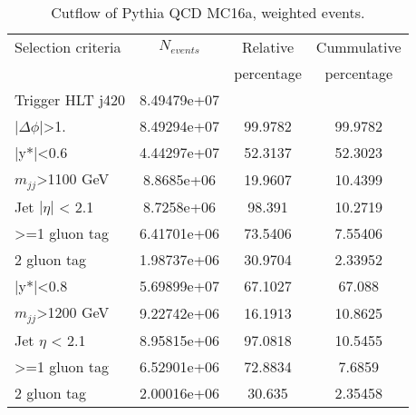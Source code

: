 \begin{table}[ht]
\begin{center}
\begin{tabular}{|l|c|c|c|}
\hline
Selection criteria & $N_{events}$ & Relative & Cummulative  \\
 & & percentage & percentage \\
\hline
Trigger HLT j420 & 8.49479e+07 &  &  \\
$|\Delta\phi|$>1. & 8.49294e+07 & 99.9782 & 99.9782 \\
\hline\hline
|y*|<0.6 & 4.44297e+07 & 52.3137 & 52.3023 \\
$m_{jj}$>1100 GeV & 8.8685e+06 & 19.9607 & 10.4399 \\
Jet $|\eta|$ < 2.1 & 8.7258e+06 & 98.391 & 10.2719 \\
>=1 gluon tag & 6.41701e+06 & 73.5406 & 7.55406 \\
2 gluon tag & 1.98737e+06 & 30.9704 & 2.33952 \\
\hline\hline
|y*|<0.8 & 5.69899e+07 & 67.1027 & 67.088 \\
$m_{jj}$>1200 GeV & 9.22742e+06 & 16.1913 & 10.8625 \\
Jet $\eta$ < 2.1 & 8.95815e+06 & 97.0818 & 10.5455 \\
>=1 gluon tag & 6.52901e+06 & 72.8834 & 7.6859 \\
2 gluon tag & 2.00016e+06 & 30.635 & 2.35458 \\
\hline
\end{tabular}
\end{center}
\caption{Cutflow of Pythia QCD MC16a, weighted events.}
\label{tab:bckgdcutflowMC16aWeighted}
\end{table}

